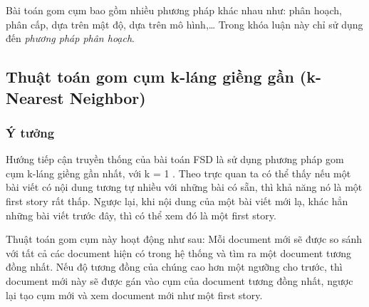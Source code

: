Bài toán gom cụm bao gồm nhiều phương pháp khác nhau như: phân hoạch, phân cấp, dựa trên mật độ, dựa trên mô hình,… Trong khóa luận này chỉ sử dụng đến \textit{phương pháp phân hoạch}.
	
\subsection{Thuật toán gom cụm k-láng giềng gần (k-Nearest Neighbor)}
	\subsubsection{Ý tưởng}
		Hướng tiếp cận truyền thống của bài toán FSD là sử dụng phương pháp gom cụm k-láng giềng gần nhất, với k = 1 \cite{Allan00detectionsbounds}. Theo trực quan ta có thể thấy nếu một bài viết có nội dung tương tự nhiều với những bài có sẵn, thì khả năng nó là một first story rất thấp. Ngược lại, khi nội dung của một bài viết mới lạ, khác hẳn những bài viết trước đây, thì có thể xem đó là một first story.
		
		Thuật toán gom cụm này hoạt động như sau: Mỗi document mới sẽ được so sánh với tất cả các document hiện có trong hệ thống và tìm ra một document tương đồng nhất. Nếu độ tương đồng của chúng cao hơn một ngưỡng cho trước, thì document mới này sẽ được gán vào cụm của document tương đồng nhất, ngược lại tạo cụm mới và xem document mới như một first story.
		
